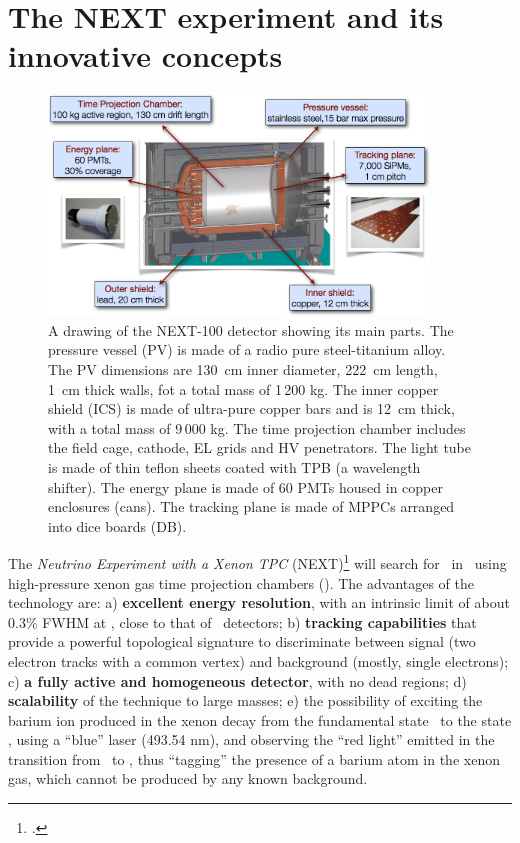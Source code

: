 \section{The NEXT experiment and its innovative concepts}
\begin{figure}
\centering
\includegraphics[width=0.9\textwidth]{img/NEXT.png}
\caption{\small A drawing of the NEXT-100 detector showing its main parts. The pressure vessel (PV) is made of a radio pure steel-titanium alloy. The PV dimensions are 130~cm inner diameter, 222~cm length, 1~cm thick walls, fot a total mass of 1\,200 kg. The inner copper shield (ICS) is made of ultra-pure copper bars and is 12~cm thick, with a total mass of 9\,000 kg. The time projection chamber includes the field cage, cathode, EL grids and HV penetrators.
The light tube is made of thin teflon sheets coated with TPB (a wavelength shifter). 
The energy plane is made of 60 PMTs housed in copper enclosures (cans).
The tracking plane is made of MPPCs arranged into dice boards (DB). 
} \label{fig.NEXT100}
\end{figure}

The \emph{Neutrino Experiment with a Xenon TPC} (NEXT)\footcite{next} will search for \bbonu\ in \XE\ using  high-pressure xenon gas  time projection chambers (\HPXE). The advantages of the technology are: 
a) {\bf excellent energy resolution}, with an intrinsic limit of about 0.3\% FWHM at \Qbb, close to that of \GE\ detectors; b)
{\bf tracking capabilities} that provide a powerful topological signature to discriminate between signal (two electron tracks with a common vertex) and background (mostly, single electrons); c)
{\bf a fully active and homogeneous detector}, with no dead regions; d) {\bf scalability} of the technique to large masses; e) the possibility of exciting the barium ion produced in the xenon decay from the fundamental state \TwoS\ to the state \TwoP, using a ``blue'' laser (493.54 nm), and observing the ``red light'' emitted in the transition from \TwoP\ to \TwoD, thus ``tagging'' the presence of a barium atom in the xenon gas, which cannot be produced by any known background. 

